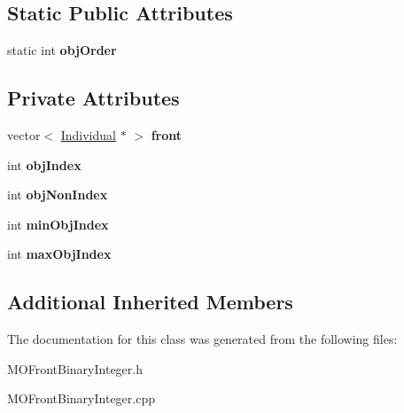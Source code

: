 \subsection*{Static Public Attributes}
\begin{DoxyCompactItemize}
\item 
\mbox{\label{classMOFrontBinaryInteger_a504cbd16e49176bfb1da068724e1855d}} 
static int {\bfseries obj\+Order}
\end{DoxyCompactItemize}
\subsection*{Private Attributes}
\begin{DoxyCompactItemize}
\item 
\mbox{\label{classMOFrontBinaryInteger_abd62291c97b834b9b638cf07b90ef16e}} 
vector$<$ \mbox{\hyperlink{classIndividual}{Individual}} $\ast$ $>$ {\bfseries front}
\item 
\mbox{\label{classMOFrontBinaryInteger_a202f9e78cedee3e6f23b9eb9fdaebd99}} 
int {\bfseries obj\+Index}
\item 
\mbox{\label{classMOFrontBinaryInteger_a05e0ccf73f5591c6886bbb878e13e496}} 
int {\bfseries obj\+Non\+Index}
\item 
\mbox{\label{classMOFrontBinaryInteger_a55bc21f3a3c4814bd2420dd2dca15104}} 
int {\bfseries min\+Obj\+Index}
\item 
\mbox{\label{classMOFrontBinaryInteger_a742df4647e879e87a29165a1d7ea401b}} 
int {\bfseries max\+Obj\+Index}
\end{DoxyCompactItemize}
\subsection*{Additional Inherited Members}


The documentation for this class was generated from the following files\+:\begin{DoxyCompactItemize}
\item 
M\+O\+Front\+Binary\+Integer.\+h\item 
M\+O\+Front\+Binary\+Integer.\+cpp\end{DoxyCompactItemize}
